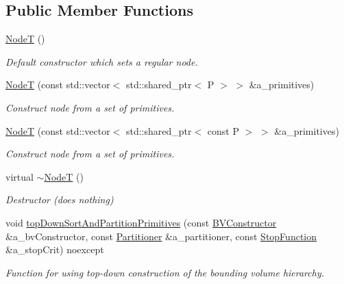 \subsection*{Public Member Functions}
\begin{DoxyCompactItemize}
\item 
\mbox{\label{classBVH_1_1NodeT_a960d0972bec81cf782b36e57f87da1f1}} 
\hyperlink{classBVH_1_1NodeT_a960d0972bec81cf782b36e57f87da1f1}{NodeT} ()
\begin{DoxyCompactList}\small\item\em Default constructor which sets a regular node. \end{DoxyCompactList}\item 
\hyperlink{classBVH_1_1NodeT_a6da86ccc8e4a0c556cd67ca59af983dc}{NodeT} (const std\+::vector$<$ std\+::shared\+\_\+ptr$<$ P $>$ $>$ \&a\+\_\+primitives)
\begin{DoxyCompactList}\small\item\em Construct node from a set of primitives. \end{DoxyCompactList}\item 
\hyperlink{classBVH_1_1NodeT_a6312ce04f70c2e1a860ce380298909b6}{NodeT} (const std\+::vector$<$ std\+::shared\+\_\+ptr$<$ const P $>$ $>$ \&a\+\_\+primitives)
\begin{DoxyCompactList}\small\item\em Construct node from a set of primitives. \end{DoxyCompactList}\item 
\mbox{\label{classBVH_1_1NodeT_a5bc328f2381b6babe37496758ea4b583}} 
virtual \hyperlink{classBVH_1_1NodeT_a5bc328f2381b6babe37496758ea4b583}{$\sim$\+NodeT} ()
\begin{DoxyCompactList}\small\item\em Destructor (does nothing) \end{DoxyCompactList}\item 
void \hyperlink{classBVH_1_1NodeT_acae5a575fa8b236de984fdd41e04c038}{top\+Down\+Sort\+And\+Partition\+Primitives} (const \hyperlink{classBVH_1_1NodeT_a2340f2466ed5b6eebab4bdc72004858e}{B\+V\+Constructor} \&a\+\_\+bv\+Constructor, const \hyperlink{classBVH_1_1NodeT_a3bb028655b8b961fa35109af1c14f281}{Partitioner} \&a\+\_\+partitioner, const \hyperlink{classBVH_1_1NodeT_acbe56195affc439febe8aca84db308e3}{Stop\+Function} \&a\+\_\+stop\+Crit) noexcept
\begin{DoxyCompactList}\small\item\em Function for using top-\/down construction of the bounding volume hierarchy. \end{DoxyCompactList}\item 

\end{DoxyCompactItemize}
